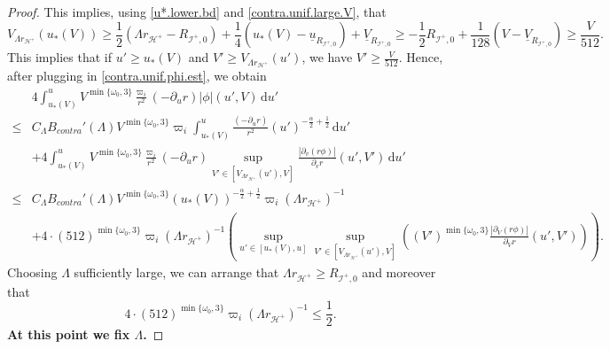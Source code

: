 \documentclass[10pt, reqno]{amsart}
\theoremstyle{definition}
\theoremstyle{remark}
\theoremstyle{conjecture}
\numberwithin{equation}{section}
\newcommand{\ud}{\mathrm{d}}
\newcommand{\rd}{\partial}
\newcommand{\0}{\emptyset}
\newcommand{\alp}{\alpha}
\newcommand{\omg}{\omega}
\newcommand{\calH}{\mathcal H}
\newcommand{\calI}{\mathcal I}
\newcommand{\f}{\frac}
\newcommand{\EH}{\calH^{+}}
\newcommand{\NI}{\calI^{+}}						%
\newcommand{\ub}{\underline{u}}
\newcommand{\Vb}{\underline{V}}
\begin{document}
\begin{proof}
This implies, using \eqref{u*.lower.bd} and \eqref{contra.unif.large.V}, that
$$V_{\Lambda r_{\EH}}(u_*(V))\geq \f 12(\Lambda r_{\EH}-R_{\NI,0})+\f 14(u_*(V)-\ub_{R_{\NI,0}}) + \Vb_{R_{\NI,0}} \geq -\f 12 R_{\NI,0}+\f 1{128} (V - \Vb_{R_{\NI,0}}) \geq \f{V}{512}.$$
This implies that if $u'\geq u_*(V)$ and $V'\geq V_{\Lambda r_{\EH}}(u')$, we have $V'\geq \f{V}{512}$. Hence, after plugging in \eqref{contra.unif.phi.est}, we obtain
\begin{equation}\label{contra.upper.II.est.2}
\begin{split}
&4 \int_{u_*(V)}^u   V^{\min\{\omg_0,3\}}\frac{\varpi_i}{r^{2}}(-\rd_{u} r)|\phi|(u',V) \, \ud u'\\
\leq & C_{\Lambda} B_{contra}'(\Lambda) V^{\min\{\omg_0,3\}}  \varpi_i \int_{u_*(V)}^u \f{(-\rd_u r)}{r^2} (u')^{-\f{\alp}{2}+\f 12}\,\ud u' \\
&+ 4\int_{u_*(V)}^u   V^{\min\{\omg_0,3\}}\frac{\varpi_i}{r^{2}}(-\rd_{u} r) \sup_{V'\in [V_{\Lambda r_{\EH}}(u'),V]}\f{|\rd_v(r\phi)|}{\rd_v r}(u',V') \, \ud u'\\
\leq & C_{\Lambda} B_{contra}'(\Lambda) V^{\min\{\omg_0,3\}} \left(u_*(V)\right)^{-\f{\alp}{2}+\f 12} \varpi_i (\Lambda r_{\EH})^{-1}\\
&+4\cdot (512)^{\min\{\omg_0,3\}} \varpi_i (\Lambda r_{\EH})^{-1}\left(\sup_{u'\in [u_*(V),u]}\sup_{V'\in [V_{\Lambda r_{\EH}}(u'),V]} \left((V')^{\min\{\omg_0,3\}}\f{|\rd_V(r\phi)|}{\rd_V r}(u',V')\right)\right).
\end{split}
\end{equation}
Choosing $\Lambda$ sufficiently large, we can arrange that $\Lambda r_{\EH}\geq R_{\NI,0}$ and moreover that
$$4\cdot (512)^{\min\{\omg_0,3\}} \varpi_i (\Lambda r_{\EH})^{-1}\leq \f 12.$$
\textbf{At this point we fix $\Lambda$.} 


\end{proof}
\end{document}
